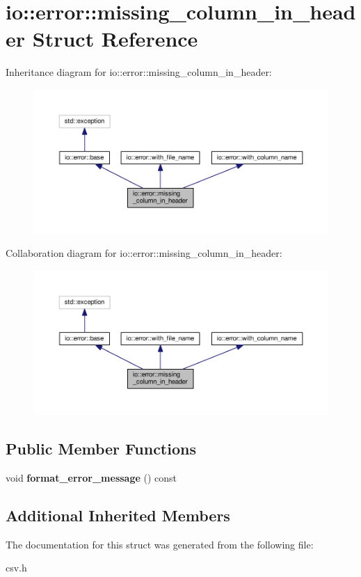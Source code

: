 \section{io\+:\+:error\+:\+:missing\+\_\+column\+\_\+in\+\_\+header Struct Reference}
\label{structio_1_1error_1_1missing__column__in__header}


Inheritance diagram for io\+:\+:error\+:\+:missing\+\_\+column\+\_\+in\+\_\+header\+:\nopagebreak
\begin{figure}[H]
\begin{center}
\leavevmode
\includegraphics[width=350pt]{structio_1_1error_1_1missing__column__in__header__inherit__graph}
\end{center}
\end{figure}


Collaboration diagram for io\+:\+:error\+:\+:missing\+\_\+column\+\_\+in\+\_\+header\+:\nopagebreak
\begin{figure}[H]
\begin{center}
\leavevmode
\includegraphics[width=350pt]{structio_1_1error_1_1missing__column__in__header__coll__graph}
\end{center}
\end{figure}
\subsection*{Public Member Functions}
\begin{DoxyCompactItemize}
\item 
void {\bfseries format\+\_\+error\+\_\+message} () const \label{structio_1_1error_1_1missing__column__in__header_acd0f4c75f6ffa54c5f9db8867bd4c8d4}

\end{DoxyCompactItemize}
\subsection*{Additional Inherited Members}


The documentation for this struct was generated from the following file\+:\begin{DoxyCompactItemize}
\item 
csv.\+h\end{DoxyCompactItemize}
